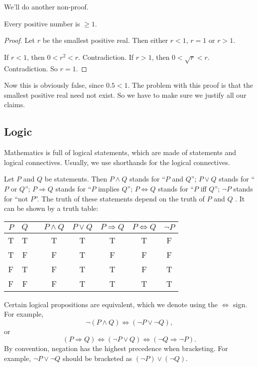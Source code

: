 \documentclass[a4paper]{article}
\begin{document}
We'll do another non-proof.
\begin{prop}
  Every positive number is $\geq 1$.
\end{prop}

\begin{proof}
  Let $r$ be the smallest positive real. Then either $r < 1$, $r = 1$ or $r > 1$.

  If $r < 1$, then $0 < r^2 < r$. Contradiction. If $r > 1$, then $0 < \sqrt{r} < r$. Contradiction. So $r = 1$.
\end{proof}
Now this is obviously false, since $0.5 < 1$. The problem with this proof is that the smallest positive real need not exist. So we have to make sure we justify all our claims.

\subsection{Logic}
Mathematics is full of logical statements, which are made of statements and logical connectives. Usually, we use shorthands for the logical connectives.

Let $P$ and $Q$ be statements. Then $P\wedge Q$ stands for ``$P$ and $Q$''; $P\vee Q$ stands for ``$P$ or $Q$''; $P\Rightarrow Q$ stands for ``$P$ implies $Q$''; $P\Leftrightarrow Q$ stands for ``$P$ iff $Q$''; $\neg P$ stands for ``not $P$''. The truth of these statements depend on the truth of $P$ and $Q$ . It can be shown by a truth table:
\begin{center}
  \begin{tabular}{cccccccc}
    \toprule
    $P$ & $Q$ &\quad &$P\wedge Q$ & $P\vee Q$ & $P\Rightarrow Q$ & $P\Leftrightarrow Q$ & $\neg P$ \\
    \midrule
    T & T & & T & T & T & T & F\\
    T & F & & F & T & F & F & F\\
    F & T & & F & T & T & F & T\\
    F & F & & F & T & T & T & T\\
    \bottomrule
  \end{tabular}
\end{center}
Certain logical propositions are equivalent, which we denote using the $\Leftrightarrow$ sign. For example,
\[
  \neg(P\wedge Q) \Leftrightarrow (\neg P\vee \neg Q),
\]
or
\[
  (P\Rightarrow Q) \Leftrightarrow (\neg P\vee Q) \Leftrightarrow (\neg Q\Rightarrow \neg P).
\]
By convention, negation has the highest precedence when bracketing. For example, $\neg P\vee \neg Q$ should be bracketed as $(\neg P)\vee (\neg Q)$.
\end{document}
